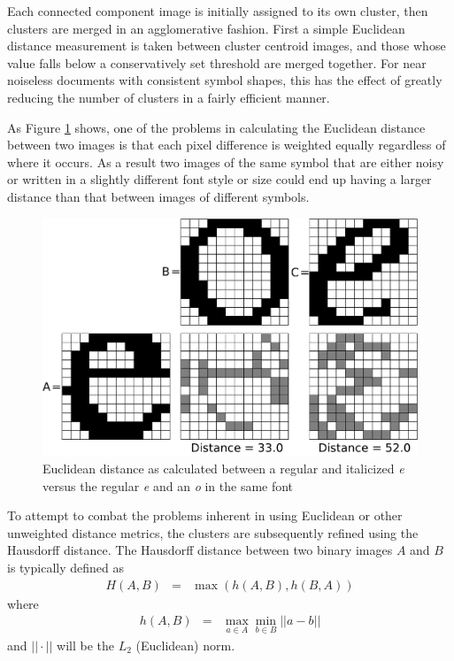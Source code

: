 \documentclass[times, 10pt,twocolumn]{article}
\begin{document}
Each connected component image is initially assigned to its own cluster, then
clusters are merged in an agglomerative fashion.  First a simple Euclidean
distance measurement is taken between cluster centroid images, and those whose
value falls below a conservatively set threshold are merged together.  For near
noiseless documents with consistent symbol shapes, this has the effect of 
greatly reducing the number of clusters in a fairly efficient manner.

As Figure \ref{eucdist_fig} shows, one of the problems in calculating the 
Euclidean distance between two images is that each pixel difference is weighted 
equally regardless of where it occurs.  As a result two images of the same 
symbol that are either noisy or written in a slightly different font style or 
size could end up having a larger distance than that between images of 
different symbols.

\begin{figure}[ht]
  \centering
  \includegraphics[scale=0.3]{figures/euc_dist_comparisons}
  \caption{Euclidean distance as calculated between a regular and italicized
  {\em e} versus the regular {\em e} and an {\em o} in the same font}
  \label{eucdist_fig}
\end{figure}

To attempt to combat the problems inherent in using Euclidean or other
unweighted distance metrics, the clusters are subsequently refined using the
Hausdorff distance\cite{rucklidge1996}.  The Hausdorff distance between two 
binary images $A$ and $B$ is typically defined as
\begin{eqnarray}
H(A,B) & = & \max(h(A,B), h(B,A))
\end{eqnarray}
where
\begin{eqnarray}
h(A,B) & = & \max_{a \in A} \min_{b \in B} || a - b ||
\end{eqnarray}
and $|| \cdot ||$ will be the $L_2$ (Euclidean) norm.
\end{document}
